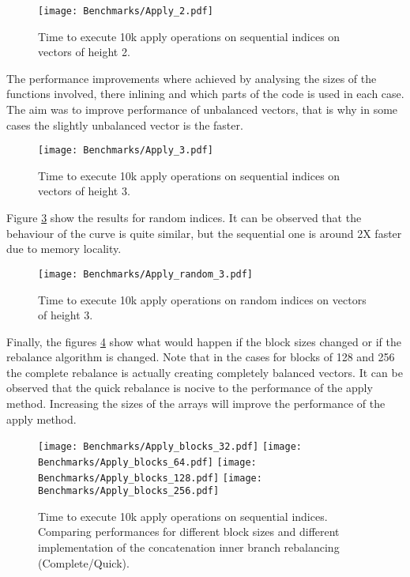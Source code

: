 \begin{figure}[h!]
  \centering
  \texttt{[image: Benchmarks/Apply\_2.pdf]}
  \caption{Time to execute 10k apply operations on sequential indices on vectors of height 2.}
   \label{ApplyBenchmarks2}
\end{figure}

The performance improvements where achieved by analysing the sizes of the functions involved, there inlining and which parts of the code is used in each case. The aim was to improve performance of unbalanced vectors, that is why in some cases the slightly unbalanced vector is the faster.

\begin{figure}[h!]
  \centering
  \texttt{[image: Benchmarks/Apply\_3.pdf]}
  \caption{Time to execute 10k apply operations on sequential indices on vectors of height 3.}
   \label{ApplyBenchmarks3}
\end{figure}

\FloatBarrier

Figure \ref{ApplyRandomBenchmarks} show the results for random indices. It can be observed that the behaviour of the curve is quite similar, but the sequential one is around 2X faster due to memory locality.

\begin{figure}[h!]
  \centering
  \texttt{[image: Benchmarks/Apply\_random\_3.pdf]}
  \caption{Time to execute 10k apply operations on random indices on vectors of height 3.}
  \label{ApplyRandomBenchmarks}
\end{figure}

\FloatBarrier

Finally, the figures \ref{ApplyBlocksBenchmarks} show what would happen if the block sizes changed or if the rebalance algorithm is changed. Note that in the cases for blocks of 128 and 256 the complete rebalance is actually creating completely balanced vectors. It can be observed that the quick rebalance is nocive to the performance of the apply method. Increasing the sizes of the arrays will improve the performance of the apply method.

\begin{figure}[h!]
  \centering
  \texttt{[image: Benchmarks/Apply\_blocks\_32.pdf]}
  \texttt{[image: Benchmarks/Apply\_blocks\_64.pdf]}
  \texttt{[image: Benchmarks/Apply\_blocks\_128.pdf]}
  \texttt{[image: Benchmarks/Apply\_blocks\_256.pdf]}
   \caption{Time to execute 10k apply operations on sequential indices. Comparing performances for different block sizes and different implementation of the concatenation inner branch rebalancing (Complete/Quick).}
  \label{ApplyBlocksBenchmarks}
\end{figure}

